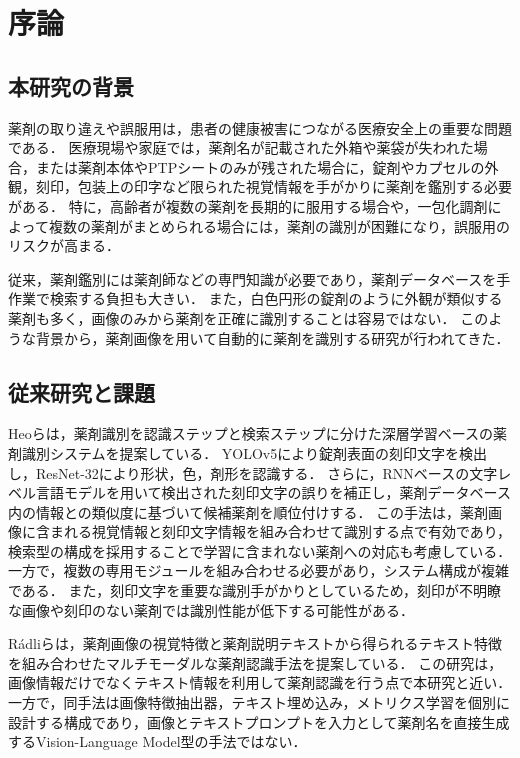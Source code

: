 \documentclass{ltjsarticle}
\begin{document}
\newpage

\tableofcontents
\newpage
\setcounter{page}{1}
\pagestyle{plain}

\section{序論}\label{sec1}

\subsection{本研究の背景}

薬剤の取り違えや誤服用は，患者の健康被害につながる医療安全上の重要な問題である．
医療現場や家庭では，薬剤名が記載された外箱や薬袋が失われた場合，または薬剤本体やPTPシートのみが残された場合に，錠剤やカプセルの外観，刻印，包装上の印字など限られた視覚情報を手がかりに薬剤を鑑別する必要がある．
特に，高齢者が複数の薬剤を長期的に服用する場合や，一包化調剤によって複数の薬剤がまとめられる場合には，薬剤の識別が困難になり，誤服用のリスクが高まる．

従来，薬剤鑑別には薬剤師などの専門知識が必要であり，薬剤データベースを手作業で検索する負担も大きい．
また，白色円形の錠剤のように外観が類似する薬剤も多く，画像のみから薬剤を正確に識別することは容易ではない．
このような背景から，薬剤画像を用いて自動的に薬剤を識別する研究が行われてきた．

\subsection{従来研究と課題}

Heoら\cite{heo2023pill}は，薬剤識別を認識ステップと検索ステップに分けた深層学習ベースの薬剤識別システムを提案している．
YOLOv5により錠剤表面の刻印文字を検出し，ResNet-32により形状，色，剤形を認識する．
さらに，RNNベースの文字レベル言語モデルを用いて検出された刻印文字の誤りを補正し，薬剤データベース内の情報との類似度に基づいて候補薬剤を順位付けする．
この手法は，薬剤画像に含まれる視覚情報と刻印文字情報を組み合わせて識別する点で有効であり，検索型の構成を採用することで学習に含まれない薬剤への対応も考慮している．
一方で，複数の専用モジュールを組み合わせる必要があり，システム構成が複雑である．
また，刻印文字を重要な識別手がかりとしているため，刻印が不明瞭な画像や刻印のない薬剤では識別性能が低下する可能性がある．

Rádliら\cite{radli2024metric}は，薬剤画像の視覚特徴と薬剤説明テキストから得られるテキスト特徴を組み合わせたマルチモーダルな薬剤認識手法を提案している．
この研究は，画像情報だけでなくテキスト情報を利用して薬剤認識を行う点で本研究と近い．
一方で，同手法は画像特徴抽出器，テキスト埋め込み，メトリクス学習を個別に設計する構成であり，画像とテキストプロンプトを入力として薬剤名を直接生成するVision-Language Model型の手法ではない．
\end{document}
